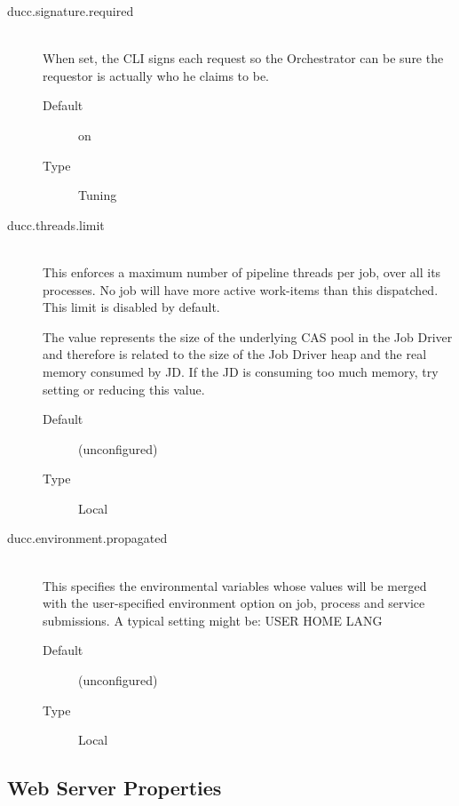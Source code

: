 \begin{description}
        \item[ducc.signature.required] \hfill \\
          When set, the CLI signs each request so the Orchestrator can be sure the requestor is 
          actually who he claims to be. 
          \begin{description}            
            \item[Default] on             
            \item[Type] Tuning 
          \end{description}


       \item[ducc.threads.limit] \hfill \\
         This enforces a maximum number of pipeline threads per job, over all its processes. No 
         job will have more active work-items than this dispatched. This limit is disabled by default. 

         The value represents the size of the underlying CAS pool in the Job Driver and therefore
         is related to the size of the Job Driver heap and the real memory consumed by JD.  If
         the JD is consuming too much memory, try setting or reducing this value.
         
         \begin{description}
           \item[Default] (unconfigured) 
           \item[Type] Local 
         \end{description}

       \item[ducc.environment.propagated] \hfill \\
         This specifies the environmental variables whose values will be merged with the
         user-specified environment option on job, process and service submissions.  A typical setting
         might be: USER HOME LANG

         \begin{description}
           \item[Default] (unconfigured) 
           \item[Type] Local 
         \end{description}
                                                                        
      \end{description}  
        

\subsection{Web Server Properties}

